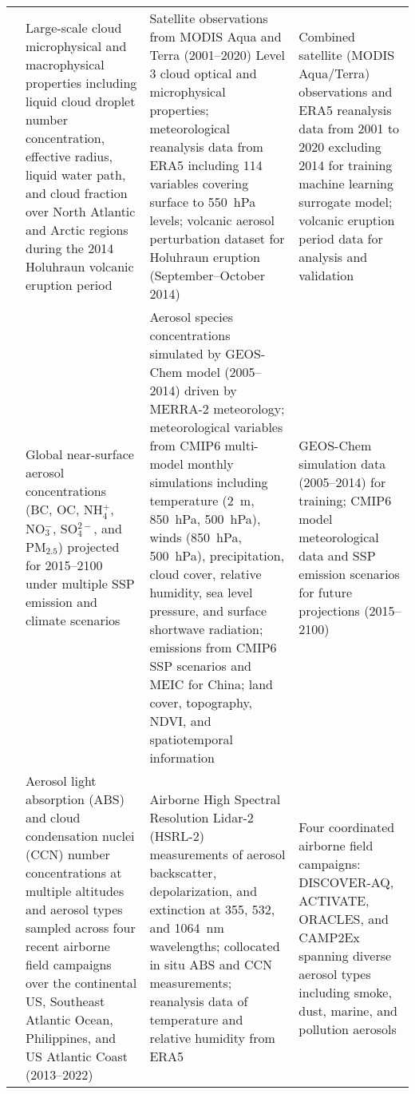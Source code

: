 \documentclass[11pt]{article}
\begin{document}
\begin{landscape}
\begin{longtable}{>{\raggedright\arraybackslash}p{2cm} 
        >{\raggedright\arraybackslash}p{4cm} 
        >{\raggedright\arraybackslash}p{10cm} 
        >{\raggedright\arraybackslash}p{6cm}}
\citet{chen2022machine} & Large-scale cloud microphysical and macrophysical properties including liquid cloud droplet number concentration, effective radius, liquid water path, and cloud fraction over North Atlantic and Arctic regions during the 2014 Holuhraun volcanic eruption period & Satellite observations from MODIS Aqua and Terra (2001–2020) Level 3 cloud optical and microphysical properties; meteorological reanalysis data from ERA5 including 114 variables covering surface to 550~hPa levels; volcanic aerosol perturbation dataset for Holuhraun eruption (September–October 2014) & Combined satellite (MODIS Aqua/Terra) observations and ERA5 reanalysis data from 2001 to 2020 excluding 2014 for training machine learning surrogate model; volcanic eruption period data for analysis and validation \\[6pt]

\citet{li2022projected} & Global near-surface aerosol concentrations (BC, OC, NH$_4^+$, NO$_3^-$, SO$_4^{2-}$, and PM$_{2.5}$) projected for 2015–2100 under multiple SSP emission and climate scenarios & Aerosol species concentrations simulated by GEOS-Chem model (2005–2014) driven by MERRA-2 meteorology; meteorological variables from CMIP6 multi-model monthly simulations including temperature (2~m, 850~hPa, 500~hPa), winds (850~hPa, 500~hPa), precipitation, cloud cover, relative humidity, sea level pressure, and surface shortwave radiation; emissions from CMIP6 SSP scenarios and MEIC for China; land cover, topography, NDVI, and spatiotemporal information & GEOS-Chem simulation data (2005–2014) for training; CMIP6 model meteorological data and SSP emission scenarios for future projections (2015–2100) \\[6pt]

\citet{redemann2024machine} & Aerosol light absorption (ABS) and cloud condensation nuclei (CCN) number concentrations at multiple altitudes and aerosol types sampled across four recent airborne field campaigns over the continental US, Southeast Atlantic Ocean, Philippines, and US Atlantic Coast (2013–2022) & Airborne High Spectral Resolution Lidar-2 (HSRL-2) measurements of aerosol backscatter, depolarization, and extinction at 355, 532, and 1064~nm wavelengths; collocated in situ ABS and CCN measurements; reanalysis data of temperature and relative humidity from ERA5 & Four coordinated airborne field campaigns: DISCOVER-AQ, ACTIVATE, ORACLES, and CAMP2Ex spanning diverse aerosol types including smoke, dust, marine, and pollution aerosols \\[6pt]


\end{longtable}
\end{landscape}
\end{document}
